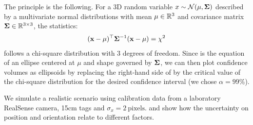 The principle is the following. For a 3D random variable $x \sim \mathcal{N}({\mu},{{\bm \Sigma}})$ described by a multivariate normal 
distributions with mean ${\bf\mu} \in \mathbb{R}^3$ and 
covariance matrix ${\bm \Sigma} \in \mathbb{R}^{3 \times 3}$, the statistics:
%
\begin{equation}
    ({\bf x} - {\bf\mu})^{\top} {\bm \Sigma}^{-1}({\bf x} - {\bf\mu}) = \chi^2
    \label{eq:chi2}
\end{equation}
%
follows a chi-square distribution with 3 degrees of freedom. Since  is the equation of an ellipse centered at $\mu$ and shape 
governed by ${\bm \Sigma}$, we can then plot confidence volumes as ellipsoids by replacing the right-hand side of  
 by the critical value of the chi-square distribution for the desired confidence interval (we chose $\alpha=99\%$). 

We simulate a realistic scenario using calibration data from a laboratory RealSense camera, 15cm tags and $\sigma_x = 2~\text{pixels}$. 
 and  show how the uncertainty on position and orientation relate to different factors.

